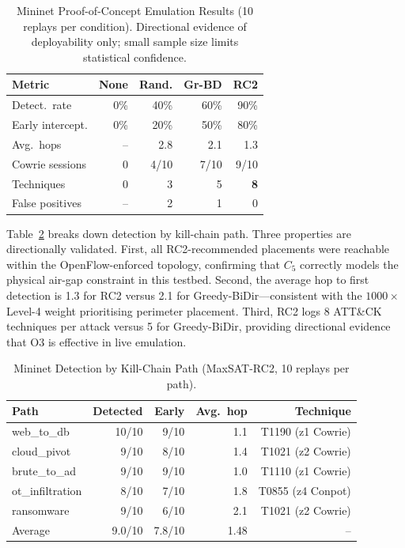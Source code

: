 \documentclass[journal]{IEEEtran}
\begin{document}
\begin{table}[!htb]
\caption{Mininet Proof-of-Concept Emulation Results
  (10 replays per condition). Directional evidence of deployability
  only; small sample size limits statistical confidence.}
\label{tab:emulation}
\centering
\small
\renewcommand{\arraystretch}{1.2}
\setlength{\tabcolsep}{4pt}
\begin{tabular}{p{2.2cm}rrrr}
\toprule
Metric & None & Rand. & Gr-BD & RC2 \\
\midrule
Detect.\ rate    & 0\%  & 40\%  & 60\%  & 90\% \\
Early intercept. & 0\%  & 20\%  & 50\%  & 80\% \\
Avg.\ hops      & --   & 2.8   & 2.1   & 1.3  \\
Cowrie sessions  & 0    & 4/10  & 7/10  & 9/10 \\
Techniques       & 0    & 3     & 5     & \textbf{8}    \\
False positives  & --   & 2     & 1     & 0    \\
\bottomrule
\end{tabular}
\end{table}

Table~\ref{tab:emulation_paths} breaks down detection by kill-chain
path. Three properties are directionally validated. First, all
RC2-recommended placements were reachable within the
OpenFlow-enforced topology, confirming that $C_5$ correctly models
the physical air-gap constraint in this testbed. Second, the average
hop to first detection is 1.3 for RC2 versus 2.1 for
Greedy-BiDir---consistent with the $1000\times$ Level-4 weight
prioritising perimeter placement. Third, RC2 logs 8 ATT\&CK
techniques per attack versus 5 for Greedy-BiDir, providing
directional evidence that O3 is effective in live emulation.

\begin{table}[!htb]
\caption{Mininet Detection by Kill-Chain Path (MaxSAT-RC2,
  10 replays per path).}
\label{tab:emulation_paths}
\centering
\renewcommand{\arraystretch}{1.2}
\begin{tabular}{lrrrr}
\toprule
Path & Detected & Early & Avg.\ hop & Technique \\
\midrule
web\_to\_db      & 10/10 & 9/10 & 1.1 & T1190 (z1 Cowrie) \\
cloud\_pivot     & 9/10  & 8/10 & 1.4 & T1021 (z2 Cowrie) \\
brute\_to\_ad    & 9/10  & 9/10 & 1.0 & T1110 (z1 Cowrie) \\
ot\_infiltration & 8/10  & 7/10 & 1.8 & T0855 (z4 Conpot) \\
ransomware       & 9/10  & 6/10 & 2.1 & T1021 (z2 Cowrie) \\
\midrule
Average & 9.0/10 & 7.8/10 & 1.48 & -- \\
\bottomrule
\end{tabular}
\end{table}
\end{document}
